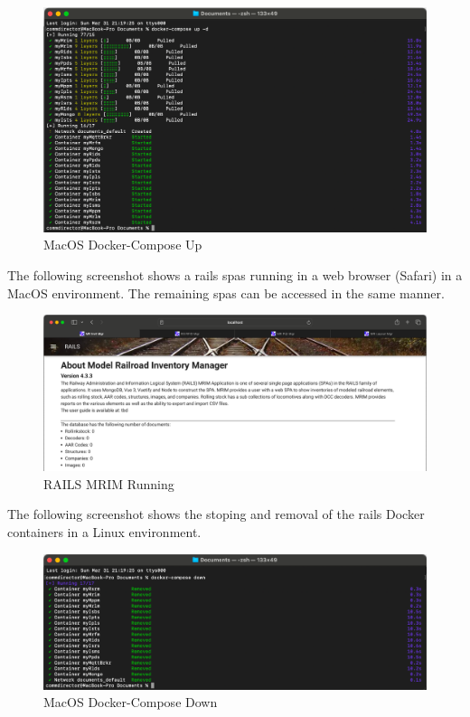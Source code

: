 \begin{figure}[H]
    \centering
    \includegraphics[scale=0.5]{win2m.png}
    \caption{MacOS Docker-Compose Up}
    \label{fig:mac-docker-cmds-2}
\end{figure}
The following screenshot shows a \gls{rails} \glspl{spa} running in a web browser (Safari) in a MacOS environment. The remaining \glspl{spa} can be accessed in the same manner.
\begin{figure}[H]
    \centering
    \includegraphics[scale=0.33]{mrimm.png}
    \caption{RAILS MRIM Running}
    \label{fig:rails-mrim}
\end{figure}
The following screenshot shows the stoping and removal of the \gls{rails} Docker containers in a Linux environment.
\begin{figure}[H]
    \centering
    \includegraphics[scale=0.5]{win3m.png}
    \caption{MacOS Docker-Compose Down}
    \label{fig:mac-docker-cmds-3}
\end{figure}